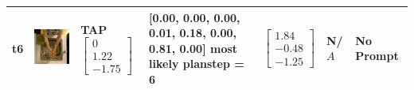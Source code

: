 \begin{longtable}{| V{0.8cm} | V{2.6cm} | V{1.6cm} | V{2.1cm} | V{1.55cm} | V{1.6cm} | V{3.2cm} |}
t6 &
\includegraphics[width=\linewidth]{fig/system/_slow2-tap2_.jpg} &
TAP
\linebreak\linebreak
$\begin{bmatrix}
0 \\
1.22 \\
-1.75
\end{bmatrix}$ &
[0.00, 0.00, 0.00, 0.01, 0.18, 0.00, 0.81, 0.00] most likely planstep = 6 &
$\begin{bmatrix}
1.84 \\
-0.48 \\
-1.25
\end{bmatrix}$ &
N/$A$ &
No Prompt
\\ \hline



\end{longtable}
